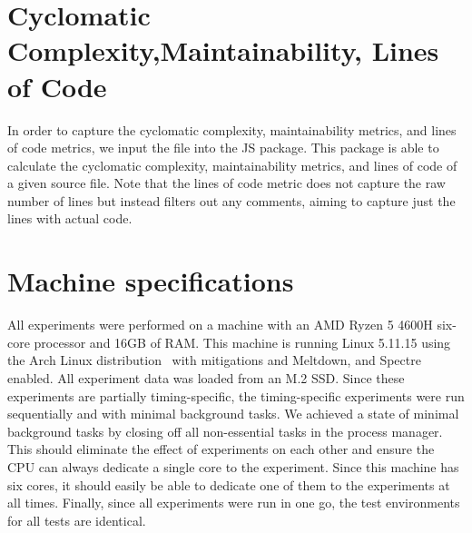 \section{Cyclomatic Complexity,Maintainability, Lines of Code}
In order to capture the cyclomatic complexity, maintainability metrics, and lines of code metrics, we input the file into the  JS package. This package is able to calculate the cyclomatic complexity, maintainability metrics, and lines of code of a given source file. Note that the lines of code metric does not capture the raw number of lines but instead filters out any comments, aiming to capture just the lines with actual code.

\section{Machine specifications}\label{sec:experimental-setup:machine-specs}
All experiments were performed on a machine with an AMD Ryzen 5 4600H six-core processor and 16GB of RAM. This machine is running Linux 5.11.15 using the Arch Linux distribution~ with mitigations and Meltdown, and Spectre enabled. All experiment data was loaded from an M.2 SSD. Since these experiments are partially timing-specific, the timing-specific experiments were run sequentially and with minimal background tasks. We achieved a state of minimal background tasks by closing off all non-essential tasks in the process manager. This should eliminate the effect of experiments on each other and ensure the CPU can always dedicate a single core to the experiment. Since this machine has six cores, it should easily be able to dedicate one of them to the experiments at all times. Finally, since all experiments were run in one go, the test environments for all tests are identical.

